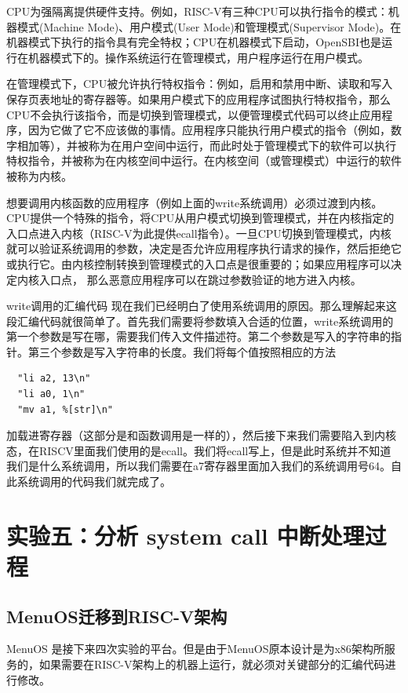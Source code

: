 \documentclass[lang=cn,10pt]{elegantbook}
\begin{document}
CPU为强隔离提供硬件支持。例如，RISC-V有三种CPU可以执行指令的模式：机器模式(Machine Mode)、用户模式(User Mode)和管理模式(Supervisor Mode)。在机器模式下执行的指令具有完全特权；CPU在机器模式下启动，OpenSBI也是运行在机器模式下的。操作系统运行在管理模式，用户程序运行在用户模式。

在管理模式下，CPU被允许执行特权指令：例如，启用和禁用中断、读取和写入保存页表地址的寄存器等。如果用户模式下的应用程序试图执行特权指令，那么CPU不会执行该指令，而是切换到管理模式，以便管理模式代码可以终止应用程序，因为它做了它不应该做的事情。应用程序只能执行用户模式的指令（例如，数字相加等），并被称为在用户空间中运行，而此时处于管理模式下的软件可以执行特权指令，并被称为在内核空间中运行。在内核空间（或管理模式）中运行的软件被称为内核。

想要调用内核函数的应用程序（例如上面的write系统调用）必须过渡到内核。CPU提供一个特殊的指令，将CPU从用户模式切换到管理模式，并在内核指定的入口点进入内核（RISC-V为此提供ecall指令）。一旦CPU切换到管理模式，内核就可以验证系统调用的参数，决定是否允许应用程序执行请求的操作，然后拒绝它或执行它。由内核控制转换到管理模式的入口点是很重要的；如果应用程序可以决定内核入口点， 那么恶意应用程序可以在跳过参数验证的地方进入内核。

write调用的汇编代码
现在我们已经明白了使用系统调用的原因。那么理解起来这段汇编代码就很简单了。首先我们需要将参数填入合适的位置，write系统调用的第一个参数是写在哪，需要我们传入文件描述符。第二个参数是写入的字符串的指针。第三个参数是写入字符串的长度。我们将每个值按照相应的方法
\begin{lstlisting}
  "li a2, 13\n" 
  "li a0, 1\n" 
  "mv a1, %[str]\n"
\end{lstlisting}

加载进寄存器（这部分是和函数调用是一样的），然后接下来我们需要陷入到内核态，在RISCV里面我们使用的是ecall。我们将ecall写上，但是此时系统并不知道我们是什么系统调用，所以我们需要在a7寄存器里面加入我们的系统调用号64。自此系统调用的代码我们就完成了。

\chapter{实验五：分析 system call 中断处理过程}

\section{MenuOS迁移到RISC-V架构}
MenuOS 是接下来四次实验的平台。但是由于MenuOS原本设计是为x86架构所服务的，如果需要在RISC-V架构上的机器上运行，就必须对关键部分的汇编代码进行修改。
\end{document}
